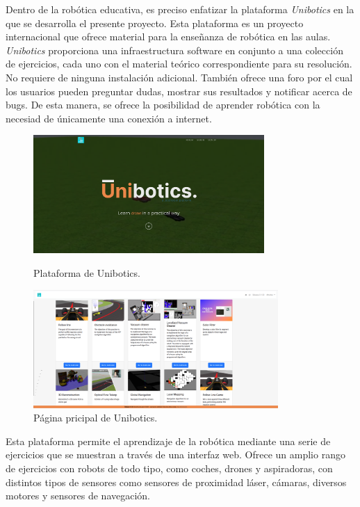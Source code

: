 \documentclass[a4paper, 12pt]{book}
\begin{document}
Dentro de la robótica educativa, es preciso enfatizar la plataforma \textit{Unibotics} en la que se desarrolla el presente proyecto. Esta plataforma es un proyecto internacional que ofrece material para la enseñanza de robótica en las aulas. \textit{Unibotics} proporciona una infraestructura software en conjunto a una colección de ejercicios, cada uno con el material teórico correspondiente para su resolución. No requiere de ninguna instalación adicional. También ofrece una foro por el cual los usuarios pueden preguntar dudas, mostrar sus resultados y notificar acerca de bugs. De esta manera, se ofrece la posibilidad de aprender robótica con la necesiad de únicamente una conexión a internet.

\begin{figure}[H]
  \centering
  \begin{minipage}[b]{0.45\textwidth}
    \includegraphics[width=\textwidth,height=45mm]{img/plataforma_unibotics.png}
    \caption{Plataforma de Unibotics.}
    \label{figura:stun}
  \end{minipage}
  \hfill
  \begin{minipage}[b]{0.45\textwidth}
    \includegraphics[width=\textwidth,height=45mm]{img/pagina_principal_unibotics.png}
    \caption{Página pricipal de Unibotics.}
    \label{figura:turn}
  \end{minipage}
\end{figure}

Esta plataforma permite el aprendizaje de la robótica mediante una serie de ejercicios que se muestran a través de una interfaz web. Ofrece un amplio rango de ejercicios con robots de todo tipo, como coches, drones y aspiradoras, con distintos tipos de sensores como sensores de proximidad láser, cámaras, diversos motores y sensores de navegación.
\end{document}
